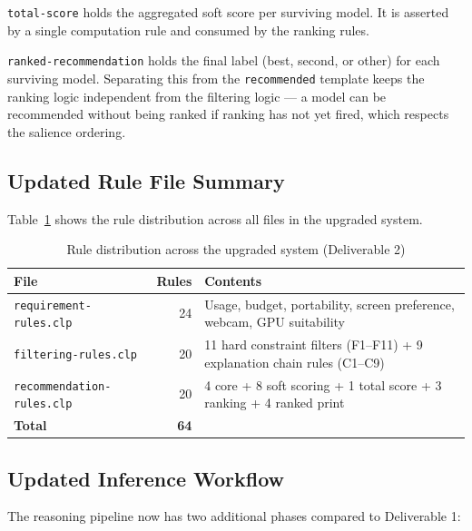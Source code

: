 \documentclass[12pt,a4paper]{article}
\begin{document}
\texttt{total-score} holds the aggregated soft score per surviving model. It is asserted by a single computation rule and consumed by the ranking rules.

\texttt{ranked-recommendation} holds the final label (best, second, or other) for each surviving model. Separating this from the \texttt{recommended} template keeps the ranking logic independent from the filtering logic --- a model can be recommended without being ranked if ranking has not yet fired, which respects the salience ordering.

\subsection{Updated Rule File Summary}

Table~\ref{tab:rulecounts} shows the rule distribution across all files in the upgraded system.

\begin{table}[h]
\centering
\renewcommand{\arraystretch}{1.5}
\begin{tabular}{lrp{6cm}}
\toprule
\textbf{File} & \textbf{Rules} & \textbf{Contents} \\
\midrule
\texttt{requirement-rules.clp} & 24 & Usage, budget, portability, screen preference, webcam, GPU suitability \\
\texttt{filtering-rules.clp}   & 20 & 11 hard constraint filters (F1--F11) + 9 explanation chain rules (C1--C9) \\
\texttt{recommendation-rules.clp} & 20 & 4 core + 8 soft scoring + 1 total score + 3 ranking + 4 ranked print \\
\midrule
\textbf{Total} & \textbf{64} & \\
\bottomrule
\end{tabular}
\caption{Rule distribution across the upgraded system (Deliverable 2)}
\label{tab:rulecounts}
\end{table}

\subsection{Updated Inference Workflow}

The reasoning pipeline now has two additional phases compared to Deliverable 1:
\end{document}
